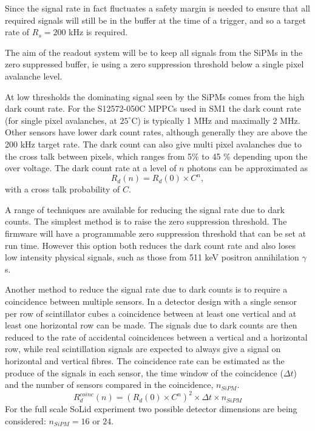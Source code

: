 \documentclass[a4paper]{article}
\begin{document}
Since the signal rate in fact fluctuates a safety margin is needed to ensure that all required signals will still be in the buffer at the time of a trigger, and so a target rate of $R_s = 200$ kHz is required.

The aim of the readout system will be to keep all signals from the SiPMs in the zero suppressed buffer, ie using a zero suppression threshold below a single pixel avalanche level.

At low thresholds the dominating signal seen by the SiPMs comes from the high dark count rate.
For the S12572-050C MPPCs used in SM1 the dark count rate (for single pixel avalanches, at $25^{\circ}$C) is typically 1 MHz and maximally 2 MHz.
Other sensors have lower dark count rates, although generally they are above the 200 kHz target rate.
The dark count can also give multi pixel avalanches due to the cross talk between pixels, which ranges from 5\% to 45 \% depending upon the over voltage.
The dark count rate at a level of $n$ photons can be approximated as
\begin{equation}
    R_d(n) = R_d(0)\times C^n,
\end{equation}
with a cross talk probability of $C$.

A range of techniques are available for reducing the signal rate due to dark counts.
The simplest method is to raise the zero suppression threshold.
The firmware will have a programmable zero suppression threshold that can be set at run time.
However this option both reduces the dark count rate and also loses low intensity physical signals, such as those from 511 keV positron annihilation $\gamma$s.

Another method to reduce the signal rate due to dark counts is to require a coincidence between multiple sensors.
In a detector design with a single sensor per row of scintillator cubes a coincidence between at least one vertical and at least one horizontal row can be made.
The signals due to dark counts are then reduced to the rate of accidental coincidences between a vertical and a horizontal row, while real scintillation signals are expected to always give a signal on horizontal and vertical fibres.
The coincidence rate can be estimated as the produce of the signals in each sensor, the time window of the coincidence ($\Delta t$) and the number of sensors compared in the coincidence, $n_{SiPM}$.
\begin{equation}
    R_d^{coinc}(n) = (R_d(0)\times C^n)^2\times\Delta t\times n_{SiPM}
\end{equation}
For the full scale SoLid experiment two possible detector dimensions are being considered: $n_{SiPM} = 16$ or $24$.
\end{document}

